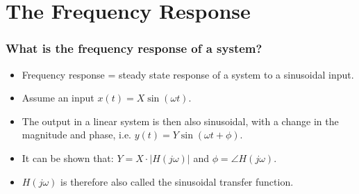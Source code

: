 
\section{The Frequency Response}


%
%
%
%
%
%


\begin{frame}
\frametitle{What is the frequency response of a system?}
\begin{definition}
	\begin{itemize}
		\item Frequency response = steady state response of a system to a sinusoidal input.\\
		\item Assume an input $x(t) = X\sin(\omega t)$.\\
		\item The output in a linear system is then also sinusoidal, with a change in the magnitude and phase, i.e. $y(t) = Y\sin(\omega t + \phi)$.\\
		\item It can be shown that: $Y = X\cdot |H(j\omega)|$ and $\phi = \angle H(j\omega)$.\\
		\item $H(j\omega)$ is therefore also called the sinusoidal transfer function. 
	\end{itemize}
\end{definition}




\end{frame}

